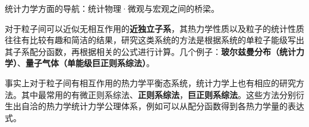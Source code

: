 统计力学方面的导航：统计物理·微观与宏观之间的桥梁。

对于粒子间可以近似无相互作用的\textbf{近独立子系}，其热力学性质以及粒子的统计性质往往有比较有趣和简洁的结果，研究这类系统的方法是根据系统的单粒子能级写出其子系配分函数，再根据相关的公式进行计算。几个例子：\textbf{玻尔兹曼分布（统计力学）}、\textbf{量子气体（单能级巨正则系综法）}。

事实上对于粒子间有相互作用的热力学平衡态系统，统计力学上也有相应的研究方法。其中最常用的有微正则系综法、\textbf{正则系综法}，\textbf{巨正则系综法}。这些方法分别衍生出自洽的热力学统计力学公理体系，例如可以从配分函数得到各热力学量的表达式。
